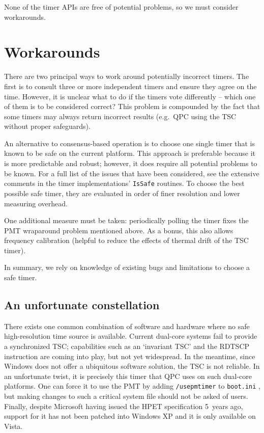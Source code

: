 \documentclass[a4paper,12pt,pdftex]{article}
\newcommand{\id}[1]{\texttt{#1}}
\begin{document}
None of the timer APIs are free of potential problems, so we must consider workarounds.

\section{Workarounds}
\label{sec:workarounds}

There are two principal ways to work around potentially incorrect timers. The first is to consult three or more independent timers and ensure they agree on the time. \citep{pcTimers} However, it is unclear what to do if the timers vote differently -- which one of them is to be considered correct? This problem is compounded by the fact that some timers may always return incorrect results (e.g.\ QPC using the TSC without proper safeguards).

An alternative to consensus-based operation is to choose one single timer that is known to be safe on the current platform. This approach is preferable because it is more predictable and robust; however, it does require all potential problems to be known. For a full list of the issues that have been considered, see the extensive comments in the timer implementations' \id{IsSafe} routines. To choose the best possible safe timer, they are evaluated in order of finer resolution and lower measuring overhead.

One additional measure must be taken: periodically polling the timer fixes the PMT wraparound problem mentioned above. As a bonus, this also allows frequency calibration (helpful to reduce the effects of thermal drift of the TSC timer).

In summary, we rely on knowledge of existing bugs and limitations to choose a safe timer.

\subsection{An unfortunate constellation}

There exists one common combination of software and hardware where no safe high-resolution time source is available. Current dual-core systems fail to provide a synchronized TSC; capabilities such as an `invariant TSC' \citep{amdNote} and the RDTSCP instruction \citep{RdtscpPresentation} are coming into play, but not yet widespread. In the meantime, since Windows does not offer a ubiquitous software solution, the TSC is not reliable. In an unfortunate twist, it is precisely this timer that QPC uses on such dual-core platforms. One can force it to use the PMT by adding \id{/usepmtimer} to \id{boot.ini} \citep{qpcUsepmtimer}, but making changes to such a critical system file should not be asked of users. Finally, despite Microsoft having issued the HPET specification 5~years ago, support for it has not been patched into Windows XP and it is only available on Vista.
\end{document}
